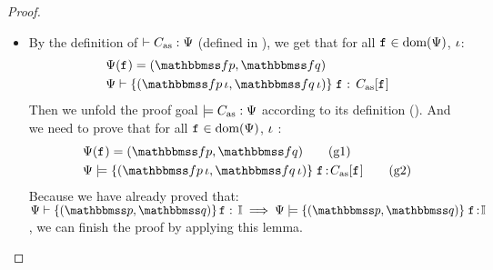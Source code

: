 {\begin{proof}
\begin{itemize}
        \item By the definition of
            $\vdash {C_{\text{as}}} : {\Psi}$
            (defined in
            \Fig{\ref{fig:Selected Inference Rules for Refinement Verification}}),
            we get that for all $\texttt{f}_{} \in \text{dom}(\Psi{})$, $\iota$:
            \begin{align}
                & \Cspec(\lab{}) = (\relspecpre, \relspecpost)
                    \label{a:wfcdhp-spec} \\
                & \wfcblk{\relspecpre \, \lgvl}
                    {\relspecpost \, \lgvl}{\lab{}}{\asmimp[\lab{}]}
                    \label{a:wfcdblk}
            \end{align}
            Then we unfold the proof goal $\models C_{\text{as}}:\Psi{}$
            according to its definition
            (\Def{\ref{def:soundness of instruction sequence}}).
            And we need to prove that for all
            $\texttt{f}_{} \in \text{dom}(\Psi{})$, $\iota$ :
            \begin{align}
                & \Cspec{}(\lab{}) = (\relspecpre, \relspecpost)
                    \tag{g1} \label{g1} \\
                & \semwfseqrel{\Cspec{}}{\relspecpre \, \lgvl}
                    {\relspecpost \, \lgvl}{\asmimp[\lab{}]}
                    \tag{g2} \label{g2}
            \end{align}
            Because we have already proved that:
            $\wdcblk{\Cspec}{\relastP}{\relastQ}{\lab{}}{\cblk}
            \implies
            \semwfseqrel{\Cspec}{\relastP}{\relastQ}{\cblk}$,
            we can finish the proof by applying this lemma.


\end{itemize}
\end{proof}}

